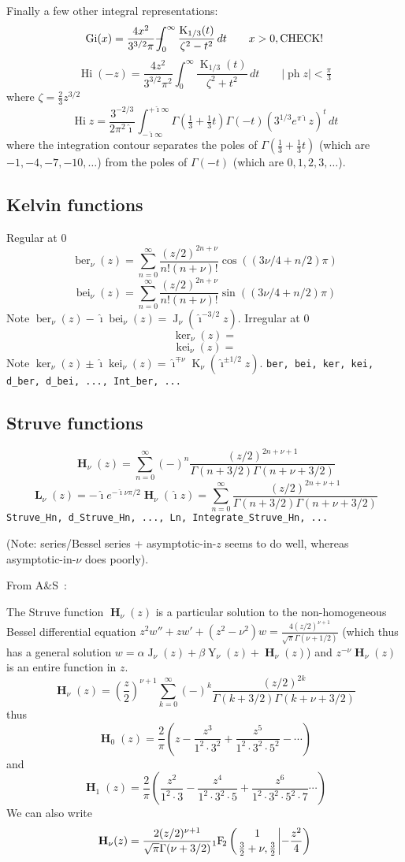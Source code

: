 \documentclass[10pt,dvipdfmx,letterpaper,twoside]{article}
\let\O=\operatorname
\newcommand{\Ob}[1]{\operatorname{\mathbf{#1}}}
\newcommand{\ii}{{\hat{\imath}}}
\newcommand{\Hyper}[5]{{\mathop{{}_{#1}\!\O{F\!}_{#2}\left({\genfrac{}{}{0pt}{}{#3}{#4}}\middle|{#5}\right)}}}
\def\Xint#1{\mathchoice
{\XXint\displaystyle\textstyle{#1}} 
{\XXint\textstyle\scriptstyle{#1}} 
{\XXint\scriptstyle\scriptscriptstyle{#1}} 
{\XXint\scriptscriptstyle\scriptscriptstyle{#1}} 
\!\int}
\def\XXint#1#2#3{{\setbox0=\hbox{$#1{#2#3}{\int}$ }
\vcenter{\hbox{$#2#3$ }}\kern-.5\wd0}}
\def\dashint{\Xint-}
\let\al=\alpha
\let\Gam=\Gamma
\begin{document}
Finally a few other integral representations:
\[ \O{Gi}(x) = \frac{4x^2}{3^{3/2}\pi} \dashint_0^\infty\frac{\O{K}_{1/3}(t)}{\zeta^2 - t^2}\,dt \qquad x>0, \text{CHECK!} \]
\[ \O{Hi}(-z) = \frac{4z^2}{3^{3/2}\pi^2} \int_0^\infty\frac{\O{K}_{1/3}(t)}{\zeta^2 + t^2}\,dt \qquad |\O{ph} z|<\tfrac\pi3 \]
where $\zeta=\tfrac23z^{3/2}$
\[ \O{Hi}{z} = \frac{3^{-2/3}}{2\pi^2\ii} \int_{-\ii\infty}^{+\ii\infty} \Gam(\tfrac13+\tfrac13t)\Gam(-t)(3^{1/3}e^{\pi\ii}z)^t\,dt \]
where the integration contour separates the poles of $\Gam(\tfrac13+\tfrac13t)$ (which are $-1, -4, -7, -10, \dots$)
from the poles of $\Gam(-t)$ (which are $0, 1, 2, 3, \dots$).

\subsection{Kelvin functions}
Regular at 0
\[ \O{ber}_\nu(z) = \sum_{n=0}^\infty \frac{(z/2)^{2n+\nu}}{n!(n+\nu)!}\cos( (3\nu/4 + n/2) \pi)\]
\[ \O{bei}_\nu(z) = \sum_{n=0}^\infty \frac{(z/2)^{2n+\nu}}{n!(n+\nu)!}\sin( (3\nu/4 + n/2) \pi)\]
Note $\O{ber}_\nu(z) - \ii\O{bei}_\nu(z) = \O{J}_\nu(\ii^{-3/2}z)$.
Irregular at 0
\[ \O{ker}_\nu(z) = \]
\[ \O{kei}_\nu(z) = \]
Note $\O{ker}_\nu(z) \pm \ii\O{kei}_\nu(z) = \ii^{\mp\nu}\O{K}_\nu(\ii^{\pm1/2}z)$.
{\tt ber, bei, ker, kei, d\_ber, d\_bei, ..., Int\_ber, ...}

\subsection{Struve functions}
\[ \Ob{H}_\nu(z) = \sum_{n=0}^\infty (-)^n \frac{(z/2)^{2n+\nu+1}}{\Gamma(n+3/2)\Gamma(n+\nu+3/2)} \]
\[ \Ob{L}_\nu(z) = -\ii e^{-\ii\nu\pi/2}\O{\mathbf{H}}_\nu(\ii z) = \sum_{n=0}^\infty \frac{(z/2)^{2n+\nu+1}}{\Gamma(n+3/2)\Gamma(n+\nu+3/2)} \]
{\tt Struve\_Hn, d\_Struve\_Hn, ..., Ln, Integrate\_Struve\_Hn, ...}

(Note: series/Bessel series + asymptotic-in-$z$ seems to do well, whereas asymptotic-in-$\nu$ does poorly).

From A\&S~\cite{a&s}:

The Struve function $\Ob{H}_\nu(z)$ is a particular solution to the non-homogeneous Bessel differential equation
$z^2w'' + zw' + (z^2-\nu^2)w = \frac{4(z/2)^{\nu+1}}{\sqrt{\pi}\Gam(\nu+1/2)}$
(which thus has a general solution $w=\al\O{J}_\nu(z) + \beta\O{Y}_\nu(z) + \Ob{H}_\nu(z)$)
and $z^{-\nu}\Ob{H}_\nu(z)$ is an entire function in $z$.
\[ \Ob{H}_\nu(z) = \left(\frac{z}{2}\right)^{\nu+1}\sum_{k=0}^\infty(-)^k\frac{(z/2)^{2k}}{\Gam(k+3/2)\Gam(k+\nu+3/2)} \]
thus
\[ \Ob{H}_0(z) = \frac2\pi\left(z-\frac{z^3}{1^2\cdot3^2}+\frac{z^5}{1^2\cdot3^2\cdot5^2}-\cdots\right) \]
and
\[ \Ob{H}_1(z) = \frac2\pi\left(\frac{z^2}{1^2\cdot3}-\frac{z^4}{1^2\cdot3^2\cdot5}+\frac{z^6}{1^2\cdot3^2\cdot5^2\cdot7}\cdots\right) \]
We can also write
\[ \Ob{H}_\nu(z) = \frac{2(z/2)^{\nu+1}}{\sqrt{\pi} \Gam(\nu+3/2)} \Hyper{1}{2}{1}{\tfrac32+\nu, \tfrac32}{-\frac{z^2}{4}} \]
\end{document}
